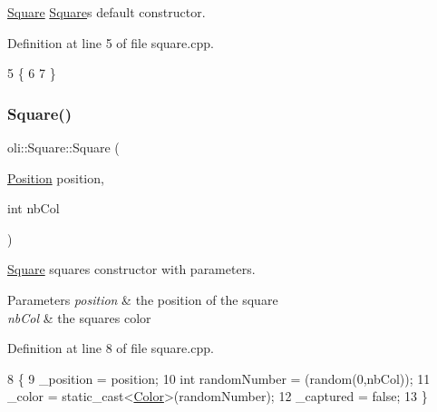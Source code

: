 \hyperlink{classoli_1_1_square}{Square} \hyperlink{classoli_1_1_square}{Square}\textquotesingle{}s default constructor. 



Definition at line 5 of file square.\+cpp.


\begin{DoxyCode}
5               \{
6 
7 \}
\end{DoxyCode}
\hypertarget{classoli_1_1_square_a178d27c0b19d746f052355048847645d}{}\label{classoli_1_1_square_a178d27c0b19d746f052355048847645d} 
\subsubsection{\texorpdfstring{Square()}{Square()}\hspace{0.1cm}{\footnotesize\ttfamily [2/3]}}
{\footnotesize\ttfamily oli\+::\+Square\+::\+Square (\begin{DoxyParamCaption}\item[{\hyperlink{classoli_1_1_position}{Position}}]{position,  }\item[{int}]{nb\+Col }\end{DoxyParamCaption})}



\hyperlink{classoli_1_1_square}{Square} square\textquotesingle{}s constructor with parameters. 


\begin{DoxyParams}{Parameters}
{\em position} & the position of the square \\
\hline
{\em nb\+Col} & the square\textquotesingle{}s color \\
\hline
\end{DoxyParams}


Definition at line 8 of file square.\+cpp.


\begin{DoxyCode}
8                                           \{
9     \_position = position;
10         \textcolor{keywordtype}{int} randomNumber = (random(0,nbCol));
11     \_color = \textcolor{keyword}{static\_cast<}\hyperlink{namespaceoli_aac44697e43b3ab2ad32fe892ab2276eb}{Color}\textcolor{keyword}{>}(randomNumber);
12     \_captured = \textcolor{keyword}{false};
13 \}
\end{DoxyCode}
\hypertarget{classoli_1_1_square_a8d8dbadb3451a21672e4485b75638776}{}\label{classoli_1_1_square_a8d8dbadb3451a21672e4485b75638776} 
